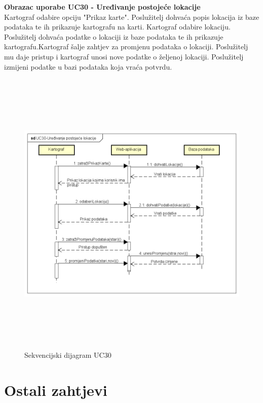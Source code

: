 				\textbf{Obrazac uporabe UC30 - Uređivanje postojeće lokacije}\\
					
					{Kartograf odabire opciju "Prikaz karte". Poslužitelj dohvaća popis lokacija iz baze podataka te ih prikazuje kartografu na karti. Kartograf odabire lokaciju. Poslužitelj dohvaća podatke o lokaciji iz baze podataka te ih prikazuje kartografu.Kartograf šalje zahtjev za promjenu podataka o lokaciji. Poslužitelj mu daje pristup i kartograf unosi nove podatke o željenoj lokaciji. Poslužitelj izmijeni podatke u bazi podataka koja vraća potvrdu.}\\
					
					\begin{figure}[H]
						\includegraphics[width=\linewidth, height=14cm]{dijagrami/sd_UC30}				
						\centering
						\caption{Sekvencijski dijagram UC30}
						\label{}
					\end{figure}
					
				
				\eject
	
		\section{Ostali zahtjevi}
		
